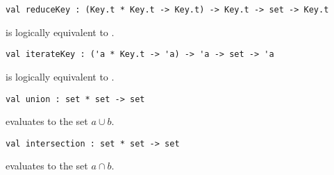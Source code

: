 \begin{cluster}
\label{grp:grm:set-interface::reducekey}

\begin{gram}[reduceKey]
\label{grm:set-interface::reducekey}
\begin{verbatim}
val reduceKey : (Key.t * Key.t -> Key.t) -> Key.t -> set -> Key.t
\end{verbatim}
 is logically equivalent to .

\end{gram}
\end{cluster}

\begin{cluster}
\label{grp:grm:set-interface::iteratekey}

\begin{gram}[iterateKey]
\label{grm:set-interface::iteratekey}
\begin{verbatim}
val iterateKey : ('a * Key.t -> 'a) -> 'a -> set -> 'a
\end{verbatim}
 is logically equivalent to .

\end{gram}
\end{cluster}

\begin{cluster}
\label{grp:grm:set-interface::union}

\begin{gram}[union]
\label{grm:set-interface::union}
\begin{verbatim}
val union : set * set -> set
\end{verbatim}
 evaluates to the set $a \cup b$.

\end{gram}
\end{cluster}

\begin{cluster}
\label{grp:grm:set-interface::intersection}

\begin{gram}[intersection]
\label{grm:set-interface::intersection}
\begin{verbatim}
val intersection : set * set -> set
\end{verbatim}
 evaluates to the set $a \cap b$.

\end{gram}
\end{cluster}

